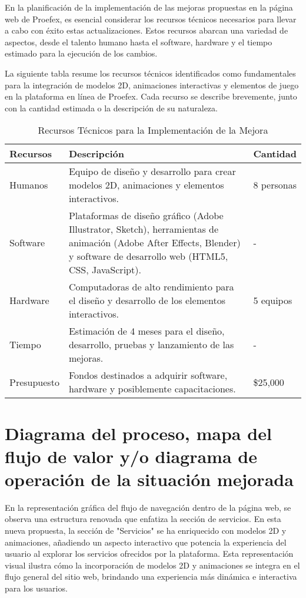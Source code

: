 En la planificación de la implementación de las mejoras propuestas en la página web de Proefex, es esencial considerar los recursos técnicos necesarios para llevar a cabo con éxito estas actualizaciones. Estos recursos abarcan una variedad de aspectos, desde el talento humano hasta el software, hardware y el tiempo estimado para la ejecución de los cambios.

La siguiente tabla resume los recursos técnicos identificados como fundamentales para la integración de modelos 2D, animaciones interactivas y elementos de juego en la plataforma en línea de Proefex. Cada recurso se describe brevemente, junto con la cantidad estimada o la descripción de su naturaleza.

\begin{table}[ht]
\centering
\begin{tabular}{|m{3cm}|m{6cm}|m{3cm}|}
\hline
\textbf{Recursos} & \textbf{Descripción} & \textbf{Cantidad} \\
\hline
Humanos & Equipo de diseño y desarrollo para crear modelos 2D, animaciones y elementos interactivos. & 8 personas \\
\hline
Software & Plataformas de diseño gráfico (Adobe Illustrator, Sketch), herramientas de animación (Adobe After Effects, Blender) y software de desarrollo web (HTML5, CSS, JavaScript). & - \\
\hline
Hardware & Computadoras de alto rendimiento para el diseño y desarrollo de los elementos interactivos. & 5 equipos \\
\hline
Tiempo & Estimación de 4 meses para el diseño, desarrollo, pruebas y lanzamiento de las mejoras. & - \\
\hline
Presupuesto & Fondos destinados a adquirir software, hardware y posiblemente capacitaciones. & \$25,000 \\
\hline
\end{tabular}
\caption{Recursos Técnicos para la Implementación de la Mejora}
\end{table}

\newpage
\section{Diagrama del proceso, mapa del flujo de valor y/o diagrama de operación de la situación mejorada}

En la representación gráfica del flujo de navegación dentro de la página web, se observa una estructura renovada que enfatiza la sección de servicios. En esta nueva propuesta, la sección de "Servicios" se ha enriquecido con modelos 2D y animaciones, añadiendo un aspecto interactivo que potencia la experiencia del usuario al explorar los servicios ofrecidos por la plataforma. Esta representación visual ilustra cómo la incorporación de modelos 2D y animaciones se integra en el flujo general del sitio web, brindando una experiencia más dinámica e interactiva para los usuarios.

